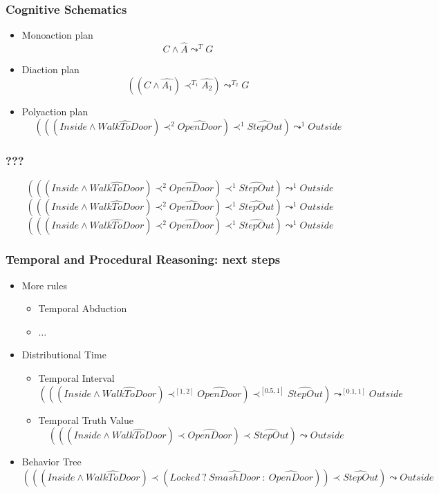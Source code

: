 \documentclass[aspectratio=169]{beamer}
\begin{document}
\begin{frame}
  \frametitle{Cognitive Schematics}

  \begin{itemize}
  \item<+-> Monoaction plan
    $$C \wedge \widehat{A} \leadsto^{T} G$$
  \item<+-> Diaction plan
    $$((C \wedge \widehat{A_1}) \prec^{T_1} \widehat{A_2}) \leadsto^{T_2} G$$
  \item<+-> Polyaction plan
    $$(((Inside \wedge \widehat{WalkToDoor}) \prec^{2}
    \widehat{OpenDoor}) \prec^{1} \widehat{StepOut}) \leadsto^{1} Outside$$
  \end{itemize}

\end{frame}

\begin{frame}
  \frametitle{???}
      $$(((Inside \wedge \widehat{WalkToDoor}) \prec^{2}
    \widehat{OpenDoor}) \prec^{1} \widehat{StepOut}) \leadsto^{1} Outside$$
      $$(((Inside \wedge \widehat{WalkToDoor}) \prec^{2}
    \widehat{OpenDoor}) \prec^{1} \widehat{StepOut}) \leadsto^{1} Outside$$
      $$(((Inside \wedge \widehat{WalkToDoor}) \prec^{2}
    \widehat{OpenDoor}) \prec^{1} \widehat{StepOut}) \leadsto^{1} Outside$$

\end{frame}

\begin{frame}
  \frametitle{Temporal and Procedural Reasoning: next steps}
  \begin{itemize}
  \item<+-> More rules
    \begin{itemize}
    \item Temporal Abduction
    \item $\dots$
    \end{itemize}
  \item<+-> Distributional Time
    \begin{itemize}
    \item Temporal Interval
      $$(((Inside \wedge \widehat{WalkToDoor}) \prec^{[1,2]}
    \widehat{OpenDoor}) \prec^{[0.5,1]} \widehat{StepOut}) \leadsto^{[0.1,1]}
    Outside$$
  \item Temporal Truth Value
      $$(((Inside \wedge \widehat{WalkToDoor}) \prec
    \widehat{OpenDoor}) \prec \widehat{StepOut}) \leadsto Outside$$
    \end{itemize}
  \item<+-> Behavior Tree
    {\small
      $$(((Inside \wedge \widehat{WalkToDoor}) \prec
    (Locked\ ?\ \widehat{SmashDoor}\ :\ \widehat{OpenDoor})) \prec \widehat{StepOut}) \leadsto Outside$$}
  \end{itemize}
\end{frame}
\end{document}
